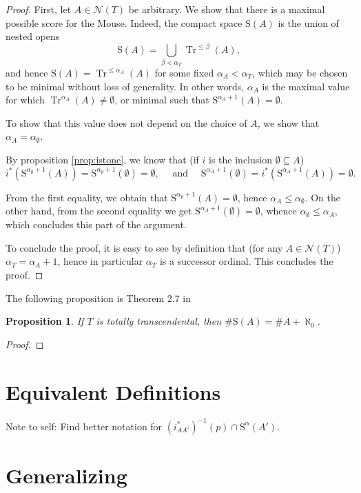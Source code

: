 \documentclass{article}
\newtheorem{prop}[theorem]{Proposition}
\theoremstyle{nonumberplain}
\newtheorem{proof}{Proof}
\newcommand{\calN}{\mathcal{N}}
\newcommand{\Stone}{\mathrm{S}}
\DeclareMathOperator{\Tr}{Tr}
\begin{document}
\begin{proof}
First, let $A \in \calN(T)$ be arbitrary. We show that there is a maximal possible score for the Mouse. Indeed, the compact space $\Stone(A)$ is the union of nested opens
\begin{equation}
\Stone(A) = \bigcup_{\beta < \alpha_T} \Tr^{\leq \beta}(A),
\end{equation}
and hence $\Stone(A) = \Tr^{\leq\alpha_A}(A)$ for some fixed $\alpha_A < \alpha_T$, which may be chosen to be minimal without loss of generality. In other words, $\alpha_A$ is the maximal value for which $\Tr^{\alpha_A}(A) \neq \emptyset$, or minimal such that $\Stone^{\alpha_A + 1}(A) = \emptyset$.

To show that this value does not depend on the choice of $A$, we show that $\alpha_A = \alpha_\emptyset$.

By proposition \ref{prop:istone}, we know that (if $i$ is the inclusion $\emptyset \subseteq A$)
\begin{equation}
i^*(\Stone^{\alpha_\emptyset + 1}(A)) = \Stone^{\alpha_\emptyset + 1}(\emptyset) = \emptyset, \quad \text{ and } \quad \Stone^{\alpha_A + 1}(\emptyset) = i^*(\Stone^{\alpha_A + 1}(A)) = \emptyset.
\end{equation}

From the first equality, we obtain that $\Stone^{\alpha_\emptyset + 1}(A) = \emptyset$, hence $\alpha_A \leq \alpha_\emptyset$. On the other hand, from the second equality we get $\Stone^{\alpha_A + 1}(\emptyset) = \emptyset$, whence $\alpha_\emptyset \leq \alpha_A$, which concludes this part of the argument.

To conclude the proof, it is easy to see by definition that (for any $A \in \calN(T)$) $\alpha_T = \alpha_A + 1$, hence in particular $\alpha_T$ is a successor ordinal. This concludes the proof.
\end{proof}

The following proposition is Theorem 2.7 in \cite{morley}

\begin{prop}
If $T$ is totally transcendental, then $\# \Stone(A) = \# A + \aleph_0$.
\end{prop}

\begin{proof}

\end{proof}



\section{Equivalent Definitions}

Note to self: Find better notation for $(i_{AA'}^*)^{-1}(p) \cap \Stone^\alpha(A')$.

\section{Generalizing}\label{sec:gen}



\end{document}
